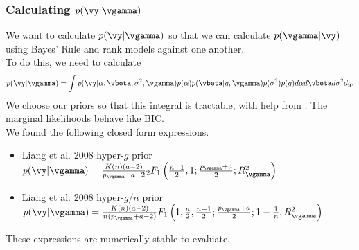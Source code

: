\begin{frame}
	\frametitle{Calculating $p(\vy | \vgamma)$}
	We want to calculate $p(\vy | \vgamma)$ so that we can calculate $p(\vgamma | \vy)$ using Bayes' Rule and rank models against	one another. \\
	To do this, we need to calculate
	$$p(\vy | \vgamma) = \int p(\vy | \alpha, \vbeta, \sigma^2, \vgamma) p(\alpha) p(\vbeta | g, \vgamma) p(\sigma^2) p(g) d \alpha d \vbeta d \sigma^2 d g.$$
	We choose our priors so that this integral is tractable, with help from \cite{Gradshteyn1988}.
	The marginal likelihoods behave like BIC. \\
	We found the following closed form expressions.
	\small
	\begin{itemize}
		\item Liang et al. 2008 hyper-$g$ prior \cite{Liang2008}
			$p(\vy | \vgamma) = \frac{K(n) (a - 2)}{p_\vgamma + a  - 2} {}_2 F_1 \left( \frac{n-1}{2}, 1; \frac{p_\vgamma + a}{2}; R_\vgamma^2 \right)$
		\item Liang et al. 2008 hyper-$g/n$ prior \cite{Liang2008}
			$p(\vy | \vgamma) = \frac{K(n) (a - 2)}{n (p_\vgamma + a  - 2)} F_1 \left( 1, \frac{a}{2}, \frac{n-1}{2}; \frac{p_\vgamma + a}{2}; 1 - \frac{1}{n}, R_\vgamma^2 \right)$
	\end{itemize}
	These expressions are numerically stable to evaluate.
\end{frame}


